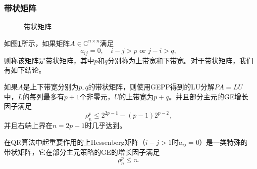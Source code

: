 \documentclass[a4paper,10pt]{ctexart}
\begin{document}
\subsubsection{带状矩阵}
\begin{figure}[htpb]
    \centering
    \caption{带状矩阵}
    \label{fig:BandMatrix}
\end{figure}
如图\ref{fig:BandMatrix}所示，如果矩阵$ A\in \mathbb{C}^{n\times n} $满足
\begin{equation}
    a_{ij} = 0, \quad i-j>p \text{ or } j-i>q,
\end{equation}
则称该矩阵是带状矩阵，其中$ p $和$ q $分别称为上带宽和下带宽。对于带状矩阵，我们有如下结论。
\begin{theorem}
    如果$ A $是上下带宽分别为$ p,q $的带状矩阵，则使用GEPP得到的LU分解$ PA = LU $中，$ L $的每列最多有$ p+1 $个非零元，$ U $的上带宽为$ p+q $。并且部分主元的GE增长因子满足
    \begin{equation}
        \rho_n^p \leqslant 2^{2p-1} - (p-1)2^{p-2},
    \end{equation}
    并且右端上界在$ n=2p+1 $时几乎达到。
\end{theorem}

在QR算法中起重要作用的上Hessenberg矩阵（$ i-j>1 $时$ a_{ij} = 0 $）是一类特殊的带状矩阵，它在部分主元策略的GE的增长因子满足
\[
    \rho_n^p \leqslant n.
\]
\end{document}
